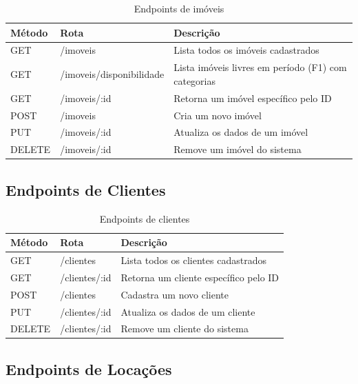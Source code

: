 \documentclass[12pt, a4paper]{article}
\newcommand{\thead}[1]{\cellcolor{tableheader}\color{white}\bfseries #1}
\newcommand{\talt}{\rowcolor{tablerowalt}}
\begin{document}
\begin{table}[H]
\centering
\begin{tabularx}{\textwidth}{|l|l|X|}
\hline
\thead{Método} & \thead{Rota} & \thead{Descrição} \\
\hline
GET    & /imoveis                   & Lista todos os imóveis cadastrados \\
\talt GET    & /imoveis/disponibilidade   & Lista imóveis livres em período (F1) com categorias \\
GET    & /imoveis/:id               & Retorna um imóvel específico pelo ID \\
\talt POST   & /imoveis                   & Cria um novo imóvel \\
PUT    & /imoveis/:id               & Atualiza os dados de um imóvel \\
\talt DELETE & /imoveis/:id               & Remove um imóvel do sistema \\
\hline
\end{tabularx}
\caption{Endpoints de imóveis}
\end{table}

\subsection{Endpoints de Clientes}

\begin{table}[H]
\centering
\begin{tabularx}{\textwidth}{|l|l|X|}
\hline
\thead{Método} & \thead{Rota} & \thead{Descrição} \\
\hline
GET    & /clientes     & Lista todos os clientes cadastrados \\
\talt GET    & /clientes/:id & Retorna um cliente específico pelo ID \\
POST   & /clientes     & Cadastra um novo cliente \\
\talt PUT    & /clientes/:id & Atualiza os dados de um cliente \\
DELETE & /clientes/:id & Remove um cliente do sistema \\
\hline
\end{tabularx}
\caption{Endpoints de clientes}
\end{table}

\subsection{Endpoints de Locações}
\end{document}
